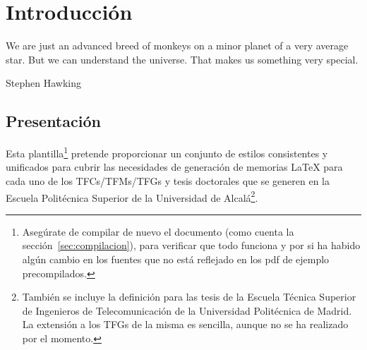 % 
% 
% 
% 
% 
% 
% 
% 

\chapter{Introducción}
\label{cha:introduccion}

\begin{FraseCelebre}
	\begin{Frase}
	We are just an advanced breed of monkeys on a minor planet of a very average star. But we can understand the universe. That makes us something very special.
	\end{Frase}
	\begin{Fuente}
	Stephen Hawking
	\end{Fuente}
\end{FraseCelebre}


\section{Presentación}
\label{sec:presentacion}

Esta plantilla\footnote{Asegúrate de compilar de nuevo el documento (como cuenta la sección~\ref{sec:compilacion}), para verificar que todo funciona y por si ha habido algún cambio en los fuentes que no está reflejado en los pdf de ejemplo precompilados.} pretende proporcionar un conjunto de estilos consistentes y unificados para cubrir las necesidades de generación de memorias \LaTeX{} para cada uno de los TFCs/TFMs/TFGs y tesis doctorales que se generen en la Escuela Politécnica Superior de la Universidad de Alcalá\footnote{También se incluye la definición para las tesis de la Escuela Técnica Superior de Ingenieros de Telecomunicación de la Universidad Politécnica de Madrid. La extensión a los TFGs de la misma es sencilla, aunque no se ha realizado por el momento.}.

